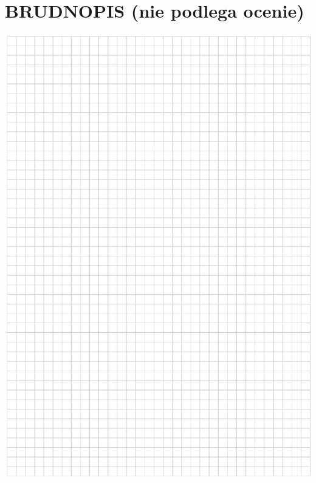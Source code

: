\documentclass[10pt]{article}
\begin{document}
\section*{BRUDNOPIS (nie podlega ocenie)}
\begin{center}
\includegraphics[max width=\textwidth]{2024_11_21_3120cbc7edd07b3a101fg-03}
\end{center}
\end{document}
